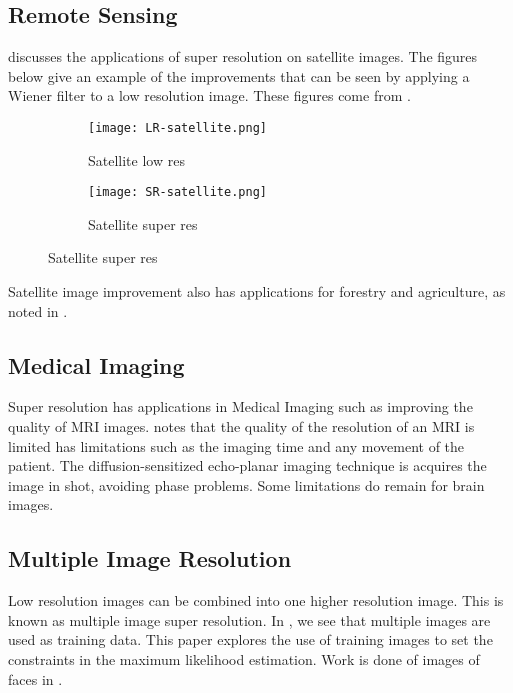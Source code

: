 \documentclass{article}
\begin{document}
\subsection{Remote Sensing}
\cite{Li} discusses the applications of super resolution on satellite
images. The figures below give an example of the improvements that can
be seen by applying a Wiener filter to a low resolution image. These
figures come from \cite{Li}.    
\begin{figure}[H]
  \centering
  \begin{subfigure}[b]{0.5\textwidth}
    \centering
  \texttt{[image: LR-satellite.png]}
  \caption{\label{fig:label} Satellite low res }
\end{subfigure}%
\begin{subfigure}[b]{0.5\textwidth}
  \centering
  \texttt{[image: SR-satellite.png]}
  \caption{\label{fig:label} Satellite super res }
  \end{subfigure}
\end{figure}
Satellite image improvement also has applications for forestry and
agriculture, as noted in \cite{LiSatellite}.

\subsection{Medical Imaging}
Super resolution has applications in Medical Imaging such as improving
the quality of MRI images. \cite{Peled} notes that the quality of the resolution of
an MRI is limited has limitations such as the imaging time and any
movement of the patient. The diffusion-sensitized echo-planar imaging
technique is acquires the image in shot, avoiding phase problems. Some
limitations do remain for brain images.  


\subsection{Multiple Image Resolution}
Low resolution images can be combined into one higher resolution
image. This is known as multiple image super resolution. In
\cite{CapelMulti}, we see that multiple images are used as training
data. This paper explores the use of training images
to set the constraints in the maximum likelihood estimation. Work is done of images of faces in \cite{CapelMulti}.
 
\end{document}
